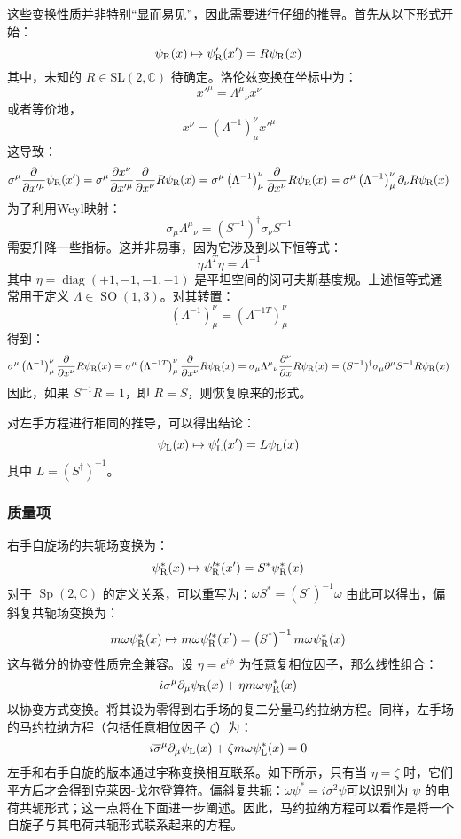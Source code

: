 这些变换性质并非特别“显而易见”，因此需要进行仔细的推导。首先从以下形式开始：
\[
\psi_{\rm{R}}(x) \mapsto \psi_{\rm{R}}^{\prime}(x') = R \psi_{\rm{R}}(x)~
\]
其中，未知的 \( R \in \mathrm{SL}(2, \mathbb{C}) \) 待确定。洛伦兹变换在坐标中为：
\[
x'^{\mu} = {\Lambda^{\mu}}_{\nu} x^{\nu}~
\]
或者等价地，
\[
x^{\nu} = \left( \Lambda^{-1} \right)^{\nu}_{\mu} x'^{\mu}~
\]
这导致：
\[
\sigma^{\mu} \frac{\partial}{\partial x'^{\mu}} \psi_{\rm{R}}(x') = \sigma^{\mu} \frac{\partial x^{\nu}}{\partial x'^{\mu}} \frac{\partial}{\partial x^{\nu}} R \psi_{\rm{R}}(x)
= \sigma^{\mu} \left( \Lambda^{-1} \right)^{\nu}_{\mu} \frac{\partial}{\partial x^{\nu}} R \psi_{\rm{R}}(x)
= \sigma^{\mu} \left( \Lambda^{-1} \right)^{\nu}_{\mu} \partial_{\nu} R \psi_{\rm{R}}(x)~
\]
为了利用Weyl映射：
\[
\sigma_{\mu} {\Lambda^{\mu}}_{\nu} = (S^{-1})^{\dagger} \sigma_{\nu} S^{-1}~
\]
需要升降一些指标。这并非易事，因为它涉及到以下恒等式：
\[
\eta \Lambda^T \eta = \Lambda^{-1}~
\]
其中 \( \eta = \operatorname{diag}(+1, -1, -1, -1) \) 是平坦空间的闵可夫斯基度规。上述恒等式通常用于定义 \( \Lambda \in \operatorname{SO}(1,3) \)。对其转置：
\[
\left( \Lambda^{-1} \right)^{\nu}_{\mu} = \left( \Lambda^{-1T} \right)_{\mu}^{\nu}~
\]
得到：
\[
\sigma^{\mu} \left( \Lambda^{-1} \right)^{\nu}_{\mu} \frac{\partial}{\partial x^{\nu}} R \psi_{\rm{R}}(x) = \sigma^{\mu} \left( \Lambda^{-1T} \right)_{\mu}^{\nu} \frac{\partial}{\partial x^{\nu}} R \psi_{\rm{R}}(x)
= \sigma_{\mu} {\Lambda^{\mu}}_{\nu} \frac{\partial^{\nu}}{\partial x} R \psi_{\rm{R}}(x)
= (S^{-1})^{\dagger} \sigma_{\mu} \partial^{\mu} S^{-1} R \psi_{\rm{R}}(x)~
\]
因此，如果 \( S^{-1} R = 1 \)，即 \( R = S \)，则恢复原来的形式。

对左手方程进行相同的推导，可以得出结论：
\[
\psi_{\rm{L}}(x) \mapsto \psi_{\rm{L}}^{\prime}(x') = L \psi_{\rm{L}}(x)~
\]
其中 \( L = (S^{\dagger})^{-1} \)。
\subsubsection{质量项}  
右手自旋场的共轭场变换为：
\[
\psi_{\rm{R}}^{*}(x) \mapsto \psi_{\rm{R}}^{\prime *}(x') = S^{*} \psi_{\rm{R}}^{*}(x)~
\]
对于 \( \operatorname{Sp}(2, \mathbb{C}) \) 的定义关系，可以重写为：\(\omega S^{*} = \left( S^{\dagger} \right)^{-1} \omega\)
由此可以得出，偏斜复共轭场变换为：
\[
m\omega \psi_{\rm{R}}^{*}(x) \mapsto m\omega \psi_{\rm{R}}^{\prime *}(x') = \left( S^{\dagger} \right)^{-1} m\omega \psi_{\rm{R}}^{*}(x)~
\]
这与微分的协变性质完全兼容。设 \( \eta = e^{i\phi} \) 为任意复相位因子，那么线性组合：
\[
i\sigma^{\mu} \partial_{\mu} \psi_{\rm{R}}(x) + \eta m\omega \psi_{\rm{R}}^{*}(x)~
\]
以协变方式变换。将其设为零得到右手场的复二分量马约拉纳方程。同样，左手场的马约拉纳方程（包括任意相位因子 \( \zeta \)）为：
\[
i {\overline {\sigma}}^{\mu} \partial_{\mu} \psi_{\rm{L}}(x) + \zeta m\omega \psi_{\rm{L}}^{*}(x) = 0~
\]
左手和右手自旋的版本通过宇称变换相互联系。如下所示，只有当 \( \eta = \zeta \) 时，它们平方后才会得到克莱因-戈尔登算符。偏斜复共轭：\(\omega \psi^{*} = i \sigma^{2} \psi\)可以识别为 \( \psi \) 的电荷共轭形式；这一点将在下面进一步阐述。因此，马约拉纳方程可以看作是将一个自旋子与其电荷共轭形式联系起来的方程。
